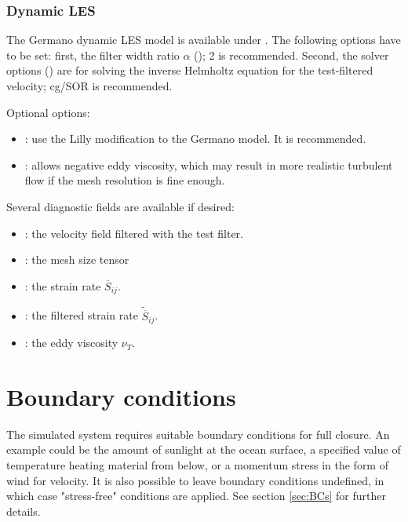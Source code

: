 \subsubsection{Dynamic LES}

The Germano dynamic LES model is available under . The following options have to be set: first, the filter width ratio $\alpha$ (); 2 is recommended. Second, the solver options () are for solving the inverse Helmholtz equation for the test-filtered velocity; cg/SOR is recommended.

Optional options:
\begin{itemize}
\item {}: use the Lilly modification to the Germano model. It is recommended.
\item {}: allows negative eddy viscosity, which may result in more realistic turbulent flow if the mesh resolution is fine enough.
\end{itemize}

Several diagnostic fields are available if desired:

\begin{itemize}
\item {}: the velocity field filtered with the test filter.
\item {}: the mesh size tensor
\item {}: the strain rate $\overline S_{ij}$.
\item {}: the filtered strain rate $\widetilde{\overline S}_{ij}$.
\item {}: the eddy viscosity $\nu_T$.
\end{itemize}

\section{Boundary conditions}\label{Sec:BCs_configure}


The simulated system requires suitable boundary conditions for full closure.
An example could be the amount of sunlight at the ocean surface, a specified value of
temperature heating material from below, or a momentum stress in the form of wind for velocity.
It is also possible to leave boundary conditions undefined, in which case "stress-free" conditions are
applied. See section \ref{sec:BCs} for further details.


